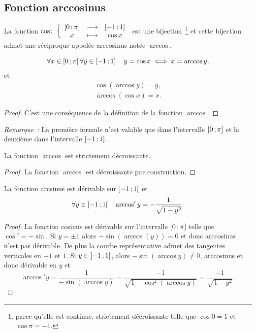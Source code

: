 \subsection{Fonction arccosinus}
\label{subsec:chap1-fonctionarccos}
\begin{defdef}
  La fonction $\cos\colon \left\{\begin{array}{ccc} \left[ 0 \, ;  \pi \right] & \longrightarrow &\left[ -1 \, ;  1 \right]\\ x & \longmapsto & \cos x \end{array} \right.$ est une bijection~\footnote{parce qu'elle est continue, strictement décroissante telle que $\cos 0=1$ et $\cos \pi=-1$.} et cette bijection admet une réciproque appelée arccosinus notée $\arccos$.
\end{defdef}
%
\begin{prop}
  \begin{equation}
    \forall x \in \left[ 0 \, ;  \pi \right] \forall y \in \left[ -1 \, ;  1 \right] \quad y = \cos x \iff x = \arccos y;
  \end{equation}
  et
  \begin{gather}
    \cos(\arccos y) = y, \\
    \arccos(\cos x) = x.
  \end{gather}
\end{prop}
\begin{proof}
  C'est une conséquence de la définition de la fonction $\arccos$.
\end{proof}
%
\emph{Remarque~:} La première formule n'est valable que dans l'intervalle $\left[ 0 \, ;  \pi \right]$ et la deuxième dans l'intervalle $\left[ -1 \, ;  1 \right]$.
\begin{prop}
  La fonction $\arccos$ est strictement décroissante.
\end{prop}
\begin{proof}
  La fonction $\arccos$ est décroissante par construction.
\end{proof}
%
\begin{prop}
  La fonction arcsinus est dérivable sur $\left] -1 \, ;  1 \right[$ et
  \begin{equation}
    \forall y \in \left] -1 \, ;  1 \right[ \quad \arccos'y = -\frac{1}{\sqrt{1-y^2}}.
  \end{equation}
\end{prop}
\begin{proof}
  La fonction cosinus est dérivable sur l'intervalle $\left[ 0 \, ;  \pi \right]$ telle que $\cos'=-\sin$. Si $y=\pm 1$ alors $-\sin(\arccos(y))=0$  et donc arccosinus n'est pas dérivable. De plus la courbe représentative admet des tangentes verticales en $-1$ et $1$. Si $y \in \left] -1 \, ;  1 \right[$, alors $-\sin(\arccos y) \neq 0$, arccosinus et donc dérivable en $y$ et
  \begin{equation}
    \arccos' y = \frac{1}{-\sin( \arccos y)}=\frac{-1}{\sqrt{1-\cos^2(\arccos y)}}=\frac{-1}{\sqrt{1-y^2}}.
  \end{equation}
\end{proof}
